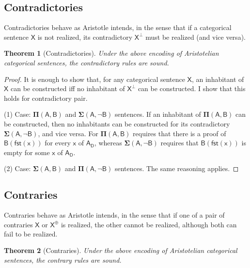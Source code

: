 \documentclass{article}
\newtheorem{theorem}{Theorem}
\newcommand\e{\mathsf}
\def\Empty/{\e{\bot}}
\def\x/{\e{x}}
\def\X/{\e{X}}
\def\Domain/{\e{D}}
\newcommand\Contradictory[1]{\e{#1^{\Empty/}}}
\newcommand\Contrary[1]{\e{#1^{\oplus}}}
\newcommand\Dep[2]{\e{#1(#2)}}
\newcommand\First[1]{\e{fst(#1)}}
\newcommand\Gen[2]{\e{#1_{#2}}}
\newcommand\PI[2]{\mathbf{\Pi}\e{(#1, #2)}}
\newcommand\SIG[2]{\mathbf{\Sigma}\e{(#1, #2)}}
\begin{document}
\subsection{Contradictories}

Contradictories behave as Aristotle intends, in the sense that if a categorical sentence $\X/$ is not realized, its contradictory $\Contradictory{X}$ must be realized (and vice versa).

\begin{theorem}[Contradictories]
  \label{theorem:contradictories}
  Under the above encoding of Aristotelian categorical sentences, the contradictory rules are sound.
\end{theorem}

\begin{proof}
  It is enough to show that, for any categorical sentence $\X/$, an inhabitant of $\X/$ can be constructed iff no inhabitant of $\Contradictory{X}$ can be constructed. I show that this holds for contradictory pair.

  (1) Case: $\PI{A}{B}$ and $\SIG{A}{\lnot B}$ sentences. If an inhabitant of $\PI{A}{B}$ can be constructed, then no inhabitants can be constructed for its contradictory $\SIG{A}{\lnot B}$, and vice versa. For $\PI{A}{B}$ requires that there is a proof of $\Dep{B}{\First{x}}$ for every $\x/$ of $\Gen{A}{\Domain/}$, whereas $\SIG{A}{\lnot B}$ requires that $\Dep{B}{\First{x}}$ is empty for some $\x/$ of $\Gen{A}{\Domain/}$.
  
  (2) Case: $\SIG{A}{B}$ and $\PI{A}{\lnot B}$ sentences. The same reasoning applies.
\end{proof}


\subsection{Contraries}

Contraries behave as Aristotle intends, in the sense that if one of a pair of contraries $\X/$ or $\Contrary{X}$ is realized, the other cannot be realized, although both can fail to be realized.

\begin{theorem}[Contraries]
  \label{theorem:contraries}
  Under the above encoding of Aristotelian categorical sentences, the contrary rules are sound.
\end{theorem}
\end{document}
